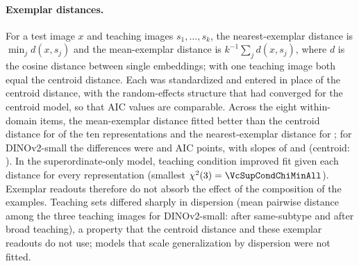 \paragraph{Exemplar distances.} For a test image $x$ and teaching images $s_1, \dots, s_k$, the nearest-exemplar distance is $\min_j d(x, s_j)$ and the mean-exemplar distance is $k^{-1}\sum_j d(x, s_j)$, where $d$ is the cosine distance between single embeddings; with one teaching image both equal the centroid distance. Each was standardized and entered in place of the centroid distance, with the random-effects structure that had converged for the centroid model, so that AIC values are comparable. Across the eight within-domain items, the mean-exemplar distance fitted better than the centroid distance for \VcDmeanBetterN{} of the ten representations and the nearest-exemplar distance for \VcDminBetterN; for DINOv2-small the differences were \VcPcDmeandAIC{} and \VcPcDmindAIC{} AIC points, with slopes of \VcPcDmeanB{} and \VcPcDminB{} (centroid: \VtPcRefB). In the superordinate-only model, teaching condition improved fit given each distance for every representation (smallest $\chi^2(3) = \VcSupCondChiMinAll$). Exemplar readouts therefore do not absorb the effect of the composition of the examples. Teaching sets differed sharply in dispersion (mean pairwise distance among the three teaching images for DINOv2-small: \VcDispSub{} after same-subtype and \VcDispSup{} after broad teaching), a property that the centroid distance and these exemplar readouts do not use; models that scale generalization by dispersion were not fitted.

\begin{table}[!htbp]
\centering
\caption{Post Hoc Adult Models (Exploratory)}
\label{tab:posthoc}
\small
\setlength{\tabcolsep}{3pt}
\noindent{}
\par{}
\end{table}

